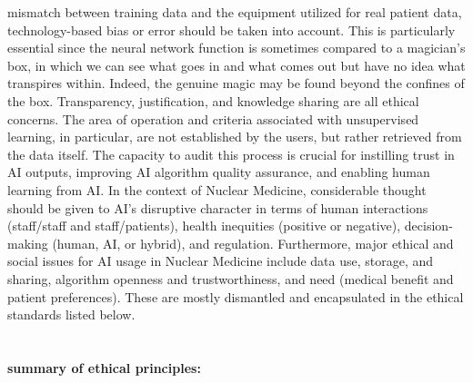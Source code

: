 \documentclass[12pt]{article}
\begin{document}
mismatch between training data and the equipment utilized for real patient data, technology-based bias or
error should be taken into account. This is particularly essential since the neural network function is sometimes
compared to a magician's box, in which we can see what goes in and what comes out but have no idea what
transpires within. Indeed, the genuine magic may be found beyond the confines of the box. Transparency,
justification, and knowledge sharing are all ethical concerns. The area of operation and criteria associated with
unsupervised learning, in particular, are not established by the users, but rather retrieved from the data itself. The capacity to audit this process is crucial for instilling trust in AI outputs, improving AI algorithm quality
assurance, and enabling human learning from AI.
In the context of Nuclear Medicine, considerable thought should be given to AI's disruptive character in terms of
human interactions (staff/staff and staff/patients), health inequities (positive or negative), decision-making
(human, AI, or hybrid), and regulation. Furthermore, major ethical and social issues for AI usage in Nuclear
Medicine include data use, storage, and sharing, algorithm openness and trustworthiness, and need (medical
benefit and patient preferences). These are mostly dismantled and encapsulated in the ethical standards listed
below.
\\ 


\\ \noindent
\\ \textbf{\large summary of ethical principles:}\\ \\
\end{document}
